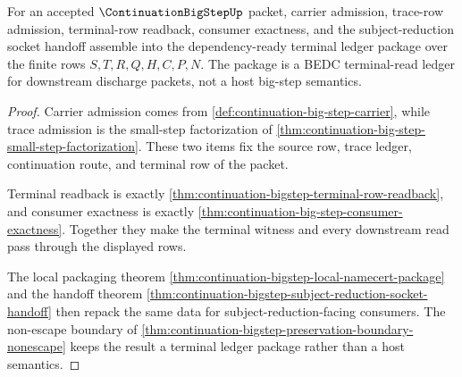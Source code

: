 \begin{theorem}
\label{thm:continuation-bigstep-terminal-ledger-package}
For an accepted $\ContinuationBigStepUp$ packet, carrier admission, trace-row
admission, terminal-row readback, consumer exactness, and the
subject-reduction socket handoff assemble into the dependency-ready terminal
ledger package over the finite rows $S,T,R,Q,H,C,P,N$. The package is a BEDC
terminal-read ledger for downstream discharge packets, not a host big-step
semantics.
\end{theorem}
\begin{proof}
Carrier admission comes from
\autoref{def:continuation-big-step-carrier}, while trace admission is the
small-step factorization of
\autoref{thm:continuation-big-step-small-step-factorization}. These two items
fix the source row, trace ledger, continuation route, and terminal row of the
packet.

Terminal readback is exactly
\autoref{thm:continuation-bigstep-terminal-row-readback}, and consumer
exactness is exactly
\autoref{thm:continuation-big-step-consumer-exactness}. Together they make the
terminal witness and every downstream read pass through the displayed rows.

The local packaging theorem
\autoref{thm:continuation-bigstep-local-namecert-package} and the handoff
theorem
\autoref{thm:continuation-bigstep-subject-reduction-socket-handoff} then
repack the same data for subject-reduction-facing consumers. The non-escape
boundary of
\autoref{thm:continuation-bigstep-preservation-boundary-nonescape} keeps the
result a terminal ledger package rather than a host semantics.
\end{proof}

